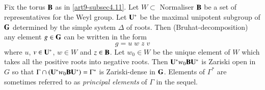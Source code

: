 \subsection{}\label{art9-subsec4.15}
Fix the torus $\mathbf{B}$ as in \ref{art9-subsec4.11}. Let $W \subset $ Normaliser $\mathbf{B}$ be a set of representatives for the Weyl group. Let $\mathbf{U}^\ast$ be the maximal unipotent subgroup of $\mathbf{G}$ determined by the simple system $\Delta$ of roots. Then (Bruhat-decomposition) any element $g \in \mathbf{G}$ can be written in the form
$$
g = u \;w \;z \;v
$$ 
where $u$, $v \in \mathbf{U}^\ast$, $w \in W$ and $z \in \mathbf{B}$. Let $w_0 \in W$ be the unique element of $W$ which takes all the positive roots into negative roots. Then $\mathbf{U}^\ast w_0 \mathbf{B} \mathbf{U}^\ast$  is Zariski open in $G$ so that $\Gamma \cap (\mathbf{U}^\ast w_0 \mathbf{B} \mathbf{U}^\ast) = \Gamma^\ast$ is Zariski-dense in $\mathbf{G}$. Elements of $\Gamma^\ast$ are sometimes referred to as \textit{principal elements} of $\Gamma$ in the sequel.

